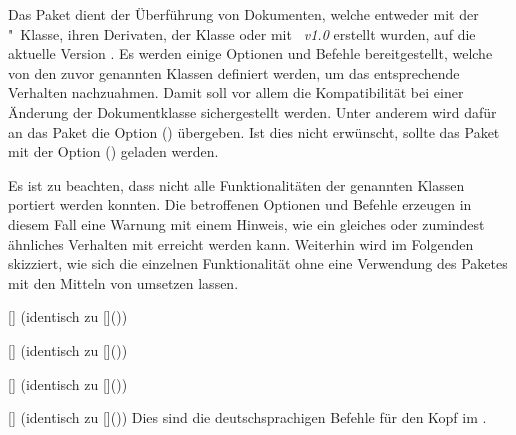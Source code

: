 \begin{DeclareEntity}{}
Das Paket  dient der Überführung von Dokumenten, welche
entweder mit der "~Klasse, ihren Derivaten, 
der Klasse  oder mit \emph{\TUDScript~v1.0} 
erstellt wurden, auf die aktuelle Version \TUDScriptVersion. Es werden einige 
Optionen und Befehle bereitgestellt, welche von den zuvor genannten Klassen 
definiert werden, um das entsprechende Verhalten nachzuahmen. Damit soll vor 
allem die Kompatibilität bei einer Änderung der Dokumentklasse sichergestellt 
werden. Unter anderem wird dafür an das Paket  die Option 
() übergeben. Ist dies nicht erwünscht, 
sollte das Paket mit der Option () geladen 
werden.
%
\begin{quoting}
\end{quoting}
%
Es ist zu beachten, dass nicht alle Funktionalitäten der genannten Klassen 
portiert werden konnten. Die betroffenen Optionen und Befehle erzeugen in 
diesem Fall eine Warnung mit einem Hinweis, wie ein gleiches oder zumindest 
ähnliches Verhalten mit \TUDScript erreicht werden kann. Weiterhin wird im 
Folgenden skizziert, wie sich die einzelnen Funktionalität ohne eine Verwendung 
des Paketes  mit den Mitteln von \TUDScript umsetzen 
lassen. 

\begin{Declaration}
  {[]}
  (identisch zu []())
\begin{Declaration}
  {[]}
  (identisch zu []())
\begin{Declaration}
  {[]}
  (identisch zu []())
\begin{Declaration}
  {[]}
  (identisch zu []())
\printdeclarationlist
%
Dies sind die deutschsprachigen Befehle für den Kopf im \CD.
\end{Declaration}
\end{Declaration}
\end{Declaration}
\end{Declaration}


\end{DeclareEntity}
